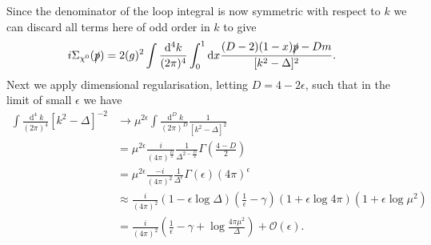 \documentclass[11pt]{article}
\def\sp{\slashed{p}}
\def\cn{\chi^0}
\renewcommand{\d}{\ensuremath{\operatorname{d}\!}}
\begin{document}
Since the denominator of the loop integral is now symmetric with respect to $k$ we can discard all terms here of odd order in $k$ to give
\begin{align}
i\Sigma_{\cn}(\slashed{p})&= 2(g)^2 \int \frac{\d^4k}{(2\pi)^4}\int_0^1 \d x \frac{(D-2)(1-x)\sp-Dm}{[ k^2-\Delta]^2}.
\end{align}
Next we apply dimensional regularisation, letting $D=4-2\epsilon$, such that in the limit of small $\epsilon$ we have
\begin{align*}
\int \frac{\d^4k}{(2\pi)^4}{[ k^2-\Delta]^{-2}} &\rightarrow  \mu^{2\epsilon}\int \frac{\d^Dk}{(2\pi)^D}  \frac{1}{[ k^2-\Delta]^2}\\
&= \mu^{2\epsilon}\frac{i}{(4\pi)^{\frac{D}{2}}} \frac{1}{\Delta^{2-\frac{D}{2}}} \Gamma\left(\frac{4-D}{2}\right) \\
&= \mu^{2\epsilon}\frac{-i}{(4\pi)^2}\frac{1}{\Delta^{\epsilon}}\Gamma\left(\epsilon\right) (4\pi)^{\epsilon}\\
&\approx \frac{i}{(4\pi)^2} \left( 1-\epsilon\log\Delta\right)\left(\frac{1}{\epsilon}-\gamma\right)\left(1+\epsilon\log 4\pi\right)\left(1+\epsilon\log\mu^2\right)\\
&=\frac{i}{(4\pi)^2} \left(\frac{1}{\epsilon}-\gamma+\log\frac{4\pi\mu^2}{\Delta}\right)+\mathcal{O}(\epsilon).
\end{align*}\\
\end{document}
